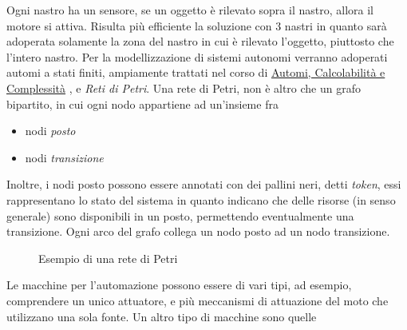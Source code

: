 \documentclass[10pt, letterpaper]{report}
\begin{document}
Ogni nastro ha un sensore, se un oggetto è rilevato sopra il nastro, allora il motore si attiva. Risulta più efficiente 
la soluzione con 3 nastri in quanto sarà adoperata solamente la zona del nastro in cui è rilevato l'oggetto, piuttosto 
che l'intero nastro.\acc 
Per la modellizzazione di sistemi autonomi verranno adoperati automi a stati finiti, ampiamente trattati nel 
corso di 
\color{blue}\href{https://github.com/CasuFrost/University_notes/blob/main/Terzo%20Anno/Automi%2C%20Calcolabilit%C3%A0%20e%20Complessit%C3%A0/LatexSourceFile/Automi%2C%20Calcolabilit%C3%A0%20e%20Complessit%C3%A0.pdf}{Automi, Calcolabilità e Complessità}
\color{black}, e \textit{Reti di Petri}. Una rete di Petri, non è altro che un grafo bipartito, in cui ogni nodo 
appartiene ad un'insieme fra \begin{itemize}
    \item nodi \textit{posto}
    \item nodi \textit{transizione}
\end{itemize}
Inoltre, i nodi posto possono essere annotati con dei pallini neri, detti \textit{token}, essi rappresentano 
lo stato del sistema in quanto indicano che delle risorse (in senso generale) sono disponibili in un posto, 
permettendo eventualmente una transizione. Ogni arco del grafo collega un nodo posto ad un nodo transizione.
\begin{figure}[h!]
    \centering
      \caption{Esempio di una rete di Petri}
\end{figure}\acc
Le macchine per l'automazione possono essere di vari tipi, ad esempio, comprendere un unico attuatore, e più 
meccanismi di attuazione del moto che utilizzano una sola fonte. Un altro tipo di macchine sono quelle 
\end{document}
